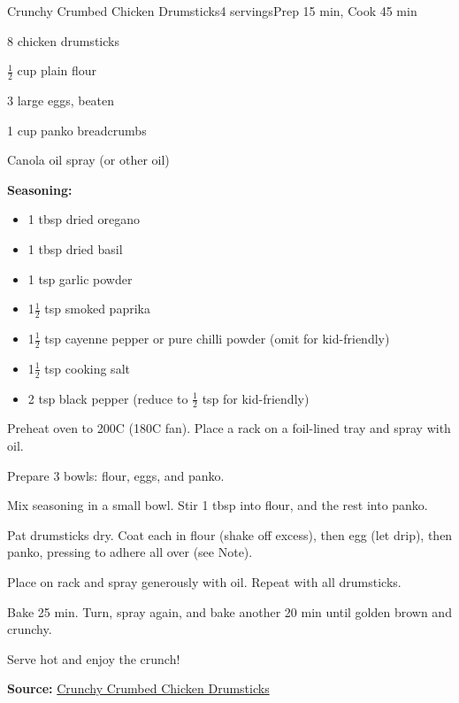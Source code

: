 \newpage
\begin{recipebox}{Crunchy Crumbed Chicken Drumsticks}{4 servings}{Prep 15 min, Cook 45 min}
\begin{ingredients}
  \item 8 chicken drumsticks
  \item $\tfrac{1}{2}$ cup plain flour
  \item 3 large eggs, beaten
  \item 1 cup panko breadcrumbs
  \item Canola oil spray (or other oil)
  \item \textbf{Seasoning:}
  \begin{itemize}
    \item 1 tbsp dried oregano
    \item 1 tbsp dried basil
    \item 1 tsp garlic powder
    \item 1$\tfrac{1}{2}$ tsp smoked paprika
    \item 1$\tfrac{1}{2}$ tsp cayenne pepper or pure chilli powder (omit for kid-friendly)
    \item 1$\tfrac{1}{2}$ tsp cooking salt
    \item 2 tsp black pepper (reduce to $\tfrac{1}{2}$ tsp for kid-friendly)
  \end{itemize}
\end{ingredients}

\begin{method}
  \item Preheat oven to 200\degree C (180\degree C fan). Place a rack on a foil-lined tray and spray with oil.
  \item Prepare 3 bowls: flour, eggs, and panko.
  \item Mix seasoning in a small bowl. Stir 1 tbsp into flour, and the rest into panko.
  \item Pat drumsticks dry. Coat each in flour (shake off excess), then egg (let drip), then panko, pressing to adhere all over (see Note).
  \item Place on rack and spray generously with oil. Repeat with all drumsticks.
  \item Bake 25 min. Turn, spray again, and bake another 20 min until golden brown and crunchy.
  \item Serve hot and enjoy the crunch!
\end{method}

\textbf{Source:} \href{https://www.recipetineats.com/crunchy-crumbed-chicken-drumsticks/}{Crunchy Crumbed Chicken Drumsticks}


\end{recipebox}
